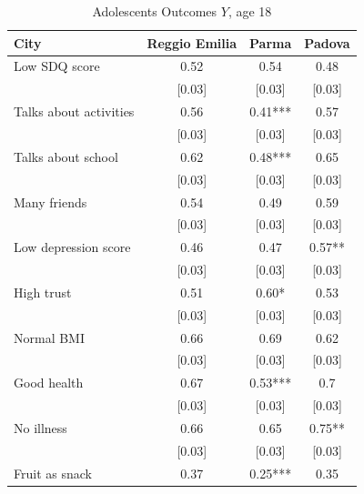 \documentclass[12pt]{article}
\begin{document}
\begin{table}[ht]
\caption{Adolescents Outcomes $Y$, age 18}
\label{tab:adoOutcomes}
\begin{center}
    \begin{tabular}{lccc}
    \hline \hline
    City  & Reggio Emilia & Parma & Padova \\
    \hline

    Low SDQ score & 0.52  & 0.54  & 0.48 \\
          & [0.03] & [0.03] & [0.03] \\
    Talks about activities & 0.56  & 0.41*** & 0.57 \\
          & [0.03] & [0.03] & [0.03] \\
    Talks about school & 0.62  & 0.48*** & 0.65 \\
          & [0.03] & [0.03] & [0.03] \\
    Many friends & 0.54  & 0.49  & 0.59 \\
          & [0.03] & [0.03] & [0.03] \\
    Low depression score & 0.46  & 0.47  & 0.57** \\
          & [0.03] & [0.03] & [0.03] \\
    High trust & 0.51  & 0.60* & 0.53 \\
          & [0.03] & [0.03] & [0.03] \\
    Normal BMI & 0.66  & 0.69  & 0.62 \\
          & [0.03] & [0.03] & [0.03] \\
    Good health & 0.67  & 0.53*** & 0.7 \\
          & [0.03] & [0.03] & [0.03] \\
    No illness & 0.66  & 0.65  & 0.75** \\
          & [0.03] & [0.03] & [0.03] \\
    Fruit as snack & 0.37  & 0.25*** & 0.35 \\

\end{tabular}
\end{center}
\end{table}
\end{document}
